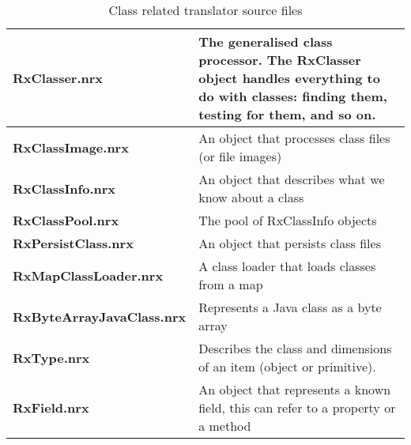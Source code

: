 \begin{table}\caption{Class related translator source files}
\begin{tabularx}{\textwidth}{>{\bfseries}lX}
    \toprule
    RxClasser.nrx       &The generalised class processor. The RxClasser object handles
    everything to do with classes: finding them, testing for them, and so on.
    \\\midrule
    RxClassImage.nrx    &An object that processes class files (or file images)
    \\\midrule
    RxClassInfo.nrx     &An object that describes what we know about a class
    \\\midrule
    RxClassPool.nrx     &The pool of RxClassInfo objects
    \\\midrule
    RxPersistClass.nrx  &An object that persists class files
    \\\midrule
    RxMapClassLoader.nrx &A class loader that loads classes from a map
    \\\midrule
    RxByteArrayJavaClass.nrx &Represents a Java class as a byte array
    \\\midrule
    RxType.nrx          &Describes the class and dimensions of an item (object or primitive).
    \\\midrule
    RxField.nrx         &An object that represents a known field, this can refer to a property or a method
    \\\bottomrule
\end{tabularx}
\end{table}



